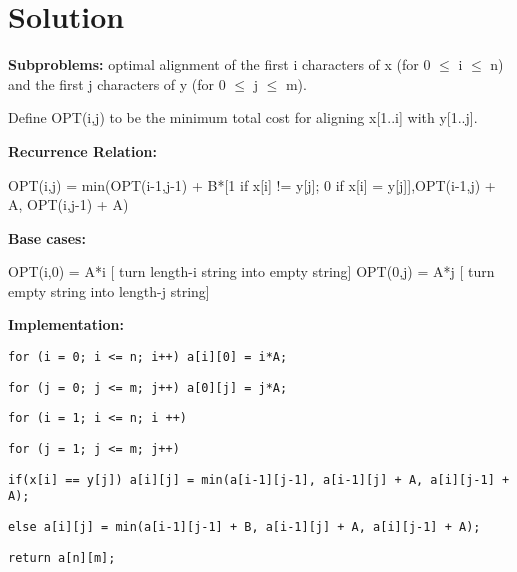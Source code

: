 \documentclass[openany]{article}
\begin{document}
\section*{Solution}
\begin{solution*}
    \textbf{Subproblems:} optimal alignment of the first i characters of x (for 0 $\leq$ i $\leq$ n) and the first j characters of y (for 0 $\leq$ j $\leq$ m).

    Define OPT(i,j) to be the minimum total cost for aligning x[1..i] with y[1..j].

    \textbf{Recurrence Relation:}
    
    OPT(i,j) = min(OPT(i-1,j-1) + B*[1 if x[i] != y[j]; 0 if x[i] = y[j]],OPT(i-1,j) + A, OPT(i,j-1) + A)

    \textbf{Base cases:}
    
OPT(i,0) = A*i [ turn length-i string into empty string]
OPT(0,j) = A*j [ turn empty string into length-j string]

    \textbf{Implementation:}

    \qquad \texttt{for (i = 0; i <= n; i++) a[i][0] = i*A;}

\qquad \texttt{for (j = 0; j <= m; j++) a[0][j] = j*A;}

\qquad \texttt{for (i = 1; i <= n; i ++)}

\qquad \qquad \texttt{for (j = 1; j <= m; j++)}

\qquad \qquad \qquad \texttt{if(x[i] == y[j]) a[i][j] = min(a[i-1][j-1], a[i-1][j] + A, a[i][j-1] + A);}

\qquad \qquad \qquad \texttt{else a[i][j] = min(a[i-1][j-1] + B, a[i-1][j] + A, a[i][j-1] + A);}

\qquad \texttt{return a[n][m];}
\end{solution*}
\end{document}
